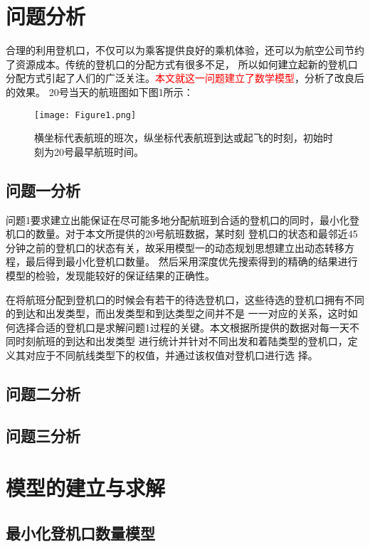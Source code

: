 \documentclass[bwprint]{gmcmthesis}
\begin{document}
\section{问题分析}
合理的利用登机口，不仅可以为乘客提供良好的乘机体验，还可以为航空公司节约了资源成本。传统的登机口的分配方式有很多不足，
所以如何建立起新的登机口分配方式引起了人们的广泛关注。\textcolor{red}{本文就这一问题建立了数学模型}，分析了改良后的效果。
20号当天的航班图如下图1所示：
\begin{figure}[!h]
\centering
\texttt{[image: Figure1.png]}
\caption{
横坐标代表航班的班次，纵坐标代表航班到达或起飞的时刻，初始时刻为20号最早航班时间。}
\end{figure}

\subsection{问题一分析}
问题1要求建立出能保证在尽可能多地分配航班到合适的登机口的同时，最小化登机口的数量。对于本文所提供的20号航班数据，某时刻
登机口的状态和最邻近45分钟之前的登机口的状态有关，故采用模型一的动态规划思想建立出动态转移方程，最后得到最小化登机口数量。
然后采用深度优先搜索得到的精确的结果进行模型的检验，发现能较好的保证结果的正确性。

在将航班分配到登机口的时候会有若干的待选登机口，这些待选的登机口拥有不同的到达和出发类型，而出发类型和到达类型之间并不是
一一对应的关系，这时如何选择合适的登机口是求解问题1过程的关键。本文根据所提供的数据对每一天不同时刻航班的到达和出发类型
进行统计并针对不同出发和着陆类型的登机口，定义其对应于不同航线类型下的权值，并通过该权值对登机口进行选
择。

\subsection{问题二分析}

\subsection{问题三分析}

\section{模型的建立与求解}

\subsection{最小化登机口数量模型}
\end{document}
